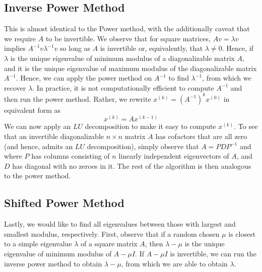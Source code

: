 \documentclass[12pt,reqno]{amsart}
\numberwithin{equation}{section}  %
\begin{document}
\subsection{Inverse Power Method}
This is almost identical to the Power method, with the additionally caveat that
we require $A$ to be invertible. We observe that for square matrices, $Av =
\lambda v$ implies $A^{-1}v \lambda^{-1}v$ so long as $A$ is invertible or,
equivalently, that $\lambda \neq 0$. Hence, if $\lambda$ is the unique
eigenvalue of minimum modulus of a diagonalizable matrix $A$, and it is the
unique eigenvalue of maximum modulus of the diagonalizable matrix $A^{-1}$.
Hence, we can apply the power method on $A^{-1}$ to find $\lambda^{-1}$, from
which we recover $\lambda$. In practice, it is not computationally efficient to
compute $A^{-1}$ and then run the power method. Rather, we 
rewrite $x^{(k)} = (A^{-1})^k x^{(0)}$ in equivalent form as
\begin{equation*}
x^{(k)} = Ax^{(k-1)}
\end{equation*}
We can now apply an $LU$ decomposition to make it easy to compute $x^{(k)}$.
To see that an invertible diagonalizable $n \times n$ matrix $A$ has cofactors that are all
zero (and hence, admits an $LU$ decomposition), simply observe that $A = PDP^{-1}$ and
where $P$ has columns consisting of $n$ linearly independent
eigenvectors of $A$, and $D$ has diagonal with no zeroes in it. 
The rest of the algorithm is then analogous to the power method.
\subsection{Shifted Power Method}	
Lastly, we would like to find all eigenvalues between those with largest and
smallest modulus, respectively. First, observe that if a random chosen $\mu$ is
closest to a simple eigenvalue $\lambda$ of a square matrix $A$, then $\lambda -
\mu$ is the unique eigenvalue of minimum modulus of $A - \mu I$. If $A - \mu I$
is invertible, we can run the inverse power method to obtain $\lambda - \mu$,
from which we are able to obtain $\lambda$.
\end{document}
